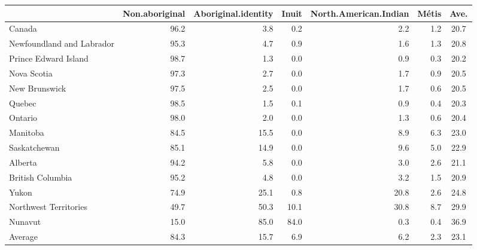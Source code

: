 \documentclass[9pt,letter]{article}
\begin{document}
\begin{longtable}[]{@{}lrrrrrc@{}}
\toprule
& Non.aboriginal & Aboriginal.identity & Inuit & North.American.Indian &
Métis & Ave.\tabularnewline
\midrule
\endhead
Canada & 96.2 & 3.8 & 0.2 & 2.2 & 1.2 & 20.7\tabularnewline
Newfoundland and Labrador & 95.3 & 4.7 & 0.9 & 1.6 & 1.3 &
20.8\tabularnewline
Prince Edward Island & 98.7 & 1.3 & 0.0 & 0.9 & 0.3 &
20.2\tabularnewline
Nova Scotia & 97.3 & 2.7 & 0.0 & 1.7 & 0.9 & 20.5\tabularnewline
New Brunswick & 97.5 & 2.5 & 0.0 & 1.7 & 0.6 & 20.5\tabularnewline
Quebec & 98.5 & 1.5 & 0.1 & 0.9 & 0.4 & 20.3\tabularnewline
Ontario & 98.0 & 2.0 & 0.0 & 1.3 & 0.6 & 20.4\tabularnewline
Manitoba & 84.5 & 15.5 & 0.0 & 8.9 & 6.3 & 23.0\tabularnewline
Saskatchewan & 85.1 & 14.9 & 0.0 & 9.6 & 5.0 & 22.9\tabularnewline
Alberta & 94.2 & 5.8 & 0.0 & 3.0 & 2.6 & 21.1\tabularnewline
British Columbia & 95.2 & 4.8 & 0.0 & 3.2 & 1.5 & 20.9\tabularnewline
Yukon & 74.9 & 25.1 & 0.8 & 20.8 & 2.6 & 24.8\tabularnewline
Northwest Territories & 49.7 & 50.3 & 10.1 & 30.8 & 8.7 &
29.9\tabularnewline
Nunavut & 15.0 & 85.0 & 84.0 & 0.3 & 0.4 & 36.9\tabularnewline
Average & 84.3 & 15.7 & 6.9 & 6.2 & 2.3 & 23.1\tabularnewline
\bottomrule
\end{longtable}
\end{document}
